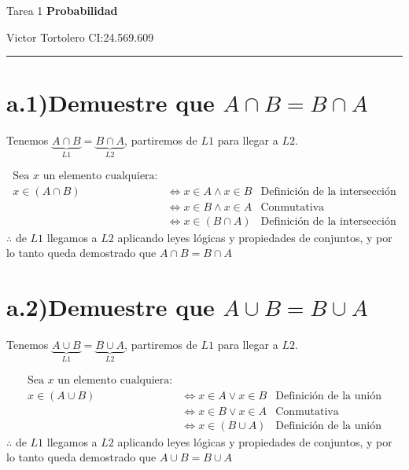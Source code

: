 \documentclass{article}
\begin{document}
\flushleft
\setlength{\parindent}{20pt}

\justify
\centerline{\huge Tarea 1 \textbf{Probabilidad}}
\centerline{Victor Tortolero CI:24.569.609}  %
\vspace{0.1cm}
\hrule


\section*{a.1)Demuestre que $A \cap B = B \cap A$}

Tenemos $\underbrace{A \cap B}_{L1} =\underbrace{ B \cap A}_{L2}$, partiremos de $L1$ para llegar a $L2$.

\begin{align*}
\text{Sea $x$ un elemento cualquiera:} \\
x \in (A \cap B) & \Leftrightarrow x \in A \land x \in B & \text{Definición de la intersección} \\
                 & \Leftrightarrow x \in B \land x \in A & \text{Conmutativa} \\
                 & \Leftrightarrow x \in (B \cap A) & \text{Definición de la intersección}
\end{align*}
$\therefore$ de $L1$ llegamos a $L2$ aplicando leyes lógicas y propiedades de conjuntos, y
	por lo tanto queda demostrado que $A \cap B = B \cap A$


\section*{a.2)Demuestre que $A \cup B = B \cup A$}
	
Tenemos $\underbrace{A \cup B}_{L1} =\underbrace{ B \cup A}_{L2}$, partiremos de $L1$ para llegar a $L2$.

\begin{align*}
\text{Sea $x$ un elemento cualquiera:} \\
x \in (A \cup B) & \Leftrightarrow x \in A \lor x \in B & \text{Definición de la unión} \\
                 & \Leftrightarrow x \in B \lor x \in A & \text{Conmutativa} \\
                 & \Leftrightarrow x \in (B \cup A) & \text{Definición de la unión}
\end{align*}
$\therefore$ de $L1$ llegamos a $L2$ aplicando leyes lógicas y propiedades de conjuntos, y
por lo tanto queda demostrado que $A \cup B = B \cup A$
\end{document}
